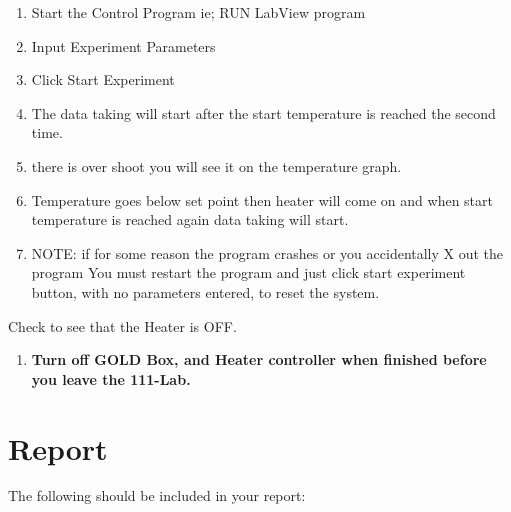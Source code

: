\documentclass{../lab}
\begin{document}
\begin{enumerate}
    \item Start the Control Program ie; RUN LabView program

    \item Input Experiment Parameters

    \item Click Start Experiment

    \item The data taking will start after the start temperature is reached the second time.

    \item there is over shoot you will see it on the temperature graph.

    \item Temperature goes below set point then heater will come on and when start temperature is reached again data taking will start.

    \item NOTE: if for some reason the program crashes or you accidentally X out the program You must restart the program and just click start experiment button, with no parameters entered, to reset the system.

\end{enumerate}

Check to see that the Heater is OFF.

\begin{enumerate}
    \item \textbf{Turn off GOLD Box, and Heater controller when finished before you leave the 111-Lab.}

\end{enumerate}

\section{Report}

The following should be included in your report:
\end{document}
